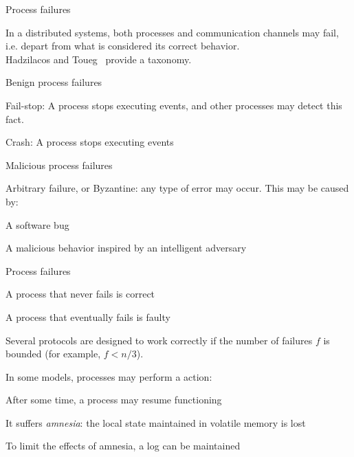 \begin{frame}{Process failures}

In a distributed systems, both processes and communication channels may fail, i.e. depart from
what is considered its correct behavior.\\
Hadzilacos and Toueg~\cite{hadzilacos94modular} provide a taxonomy. 

\begin{block}{Benign process failures}
\BI
\item \alert{Fail-stop}: A process stops executing events, and other processes may detect this fact.
\item \alert{Crash}: A process stops executing events
\EI
\end{block}

\begin{block}{Malicious process failures}
\BI
\item \alert{Arbitrary failure}, or Byzantine: any type of error may occur. This may be caused by:
  \BI
  \item A software bug
  \item A malicious behavior inspired by an intelligent adversary
  \EI
\EI
\end{block}

\end{frame}

\begin{frame}{Process failures}
	

\BIL
\item A process that never fails is \alert{correct}
\item A process that eventually fails is \alert{faulty}
\item Several protocols are designed to work correctly if the number
  of failures $f$ is bounded (for example, $f < n/3$).
\item In some models, processes may perform a  action:
  \BI
  \item After some time, a process may resume functioning
  \item It suffers {\em amnesia}: the local state maintained in volatile
    memory is lost
  \item To limit the effects of amnesia, a log can be maintained
 \EI
\EIL

\end{frame}

